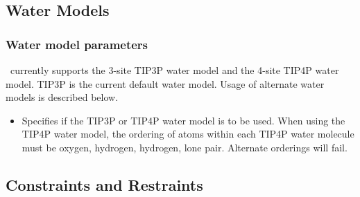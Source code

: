\subsection{Water Models}
\label{section:water_models}

\subsubsection{Water model parameters}

\NAMD~currently supports the 3-site TIP3P water model and the 4-site TIP4P water model.  TIP3P is the current default water model.  Usage of alternate water models is described below. 

\begin{itemize}

  \item
    {Specifies if the TIP3P or TIP4P water model is to be used.  When using the TIP4P water model, the ordering of atoms within each TIP4P water molecule must be oxygen, hydrogen, hydrogen, lone pair.  Alternate orderings will fail. } 

\end{itemize}


\subsection{Constraints and Restraints}

